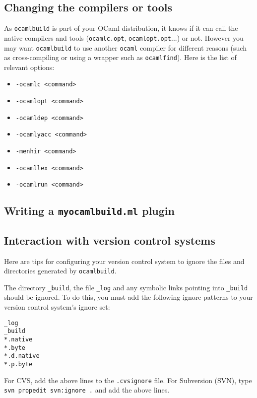 \documentclass[9pt]{article}
\newcommand{\ocb}{\texttt{ocamlbuild}\xspace}
\begin{document}
\subsection{Changing the compilers or tools}
As \ocb is part of your OCaml distribution, it knows if it can call the
native compilers and tools (\texttt{ocamlc.opt}, \texttt{ocamlopt.opt}...)
or not.  However you may want \ocb to use another \texttt{ocaml} compiler
for different reasons (such as cross-compiling or using a wrapper such as
\texttt{ocamlfind}).  Here is the list of relevant options:
\begin{itemize}
  \item \texttt{-ocamlc <command>}
  \item \texttt{-ocamlopt <command>}
  \item \texttt{-ocamldep <command>}
  \item \texttt{-ocamlyacc <command>}
  \item \texttt{-menhir <command>}
  \item \texttt{-ocamllex <command>}
  \item \texttt{-ocamlrun <command>}
\end{itemize}

\subsection{Writing a \texttt{myocamlbuild.ml} plugin}
\subsection{Interaction with version control systems}
Here are tips for configuring your version control system to ignore the files
and directories generated by \ocb.

The directory \texttt{\_build}, the file \texttt{\_log} and any symbolic links
pointing into \texttt{\_build} should be ignored.
To do this, you must add the following ignore patterns to your version
control system's ignore set:
\begin{verbatim}
_log
_build
*.native
*.byte
*.d.native
*.p.byte
\end{verbatim}

For CVS, add the above lines to the \texttt{.cvsignore} file.
For Subversion (SVN), type \texttt{svn propedit svn:ignore .} and add the
above lines.
\end{document}
